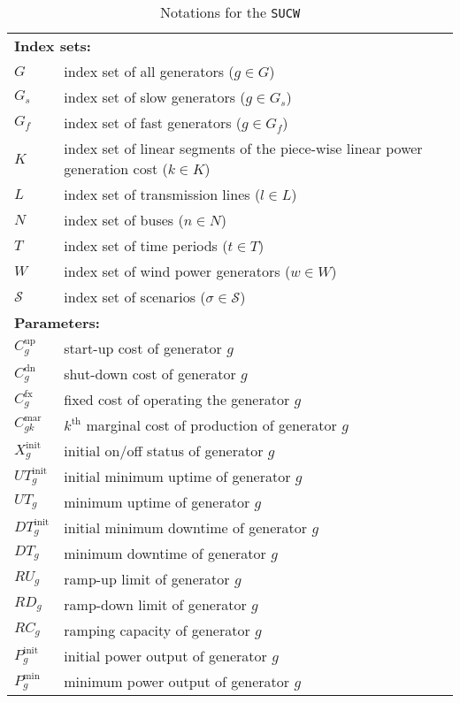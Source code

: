 \begin{table}[H]
	\centering
	\caption{Notations for the \texttt{SUCW}}
	\begin{tabular}{ll}
		\toprule
		\multicolumn{2}{l}{\textbf{Index sets:}} \\
		$G$ & index set of all generators ($g\in G$)\\
		$G_s$ & index set of slow generators ($g\in G_s$)\\
		$G_f$ & index set of fast generators ($g\in G_f$)\\
		$K$ & index set of linear segments of the piece-wise linear power generation cost ($k\in K$)\\
		$L$ & index set of transmission lines ($l\in L$) \\
		$N$ & index set of buses ($n\in N$)\\
		$T$ & index set of time periods ($t\in T$)\\
		$W$ & index set of wind power generators ($w\in W$)\\
		$\mathcal{S}$ & index set of scenarios ($\sigma\in\mathcal{S}$) 		\\ \midrule
		\multicolumn{2}{l}{\textbf{Parameters:}} \\
		$C^\text{up}_g$ & start-up cost of generator $g$ \\
		$C^\text{dn}_g$ & shut-down cost of generator $g$ \\
		$C^\text{fx}_g$ & fixed cost of operating the generator $g$ \\
		$C^\text{mar}_{gk}$ & $k^\textrm{th}$ marginal cost of production of generator $g$ \\
		$X^\text{init}_g$ & initial on/off status of generator $g$ \\
		$UT^\text{init}_g$ & initial minimum uptime of generator $g$ \\
		$UT_g$ & minimum uptime of generator $g$ \\
		$DT^\text{init}_g$ & initial minimum downtime of generator $g$ \\
		$DT_g$ & minimum downtime of generator $g$ \\
		$RU_g$ & ramp-up limit of generator $g$ \\
		$RD_g$ & ramp-down limit of generator $g$ \\
		$RC_g$ & ramping capacity of generator $g$ \\
		$P^\text{init}_g$ & initial power output of generator $g$ \\
		$P^\text{min}_g$ & minimum power output of generator $g$ \\

\end{tabular}
\end{table}
